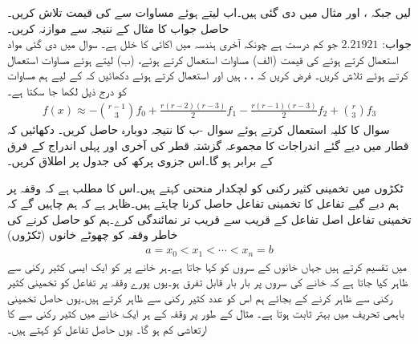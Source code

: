\quad
{} لیں جبکہ ،  اور  مثال  میں دی گئی ہیں۔اب  لیتے ہوئے مساوات  سے  کی قیمت تلاش کریں۔حاصل جواب کا مثال  کے نتیجہ سے موازنہ کریں۔\\
جواب:\quad
$\num{2.21921}$
جو کم درست ہے چونکہ آخری ہندسہ میں  اکائی کا خلل ہے۔
\quad
سوال  میں دی گئی مواد استعمال کرتے ہوئے  کی قیمت  (الف) مساوات  استعمال کرتے ہوئے، (ب)  لیتے ہوئے مساوات  استعمال کرتے ہوئے تلاش کریں۔ 
\quad
فرض کریں کہ ، ،  ہیں اور  استعمال کرتے ہوئے دکھائیں کہ  کے لیے  ہم مساوات   کو درج ذیل لکھا جا سکتا ہے۔
\begin{align*}
f(x)\approx -\binom{r-1}{3}f_0+\frac{r(r-2)(r-3)}{2}f_1-\frac{r(r-1)(r-3)}{2}f_2+\binom{r}{3}f_3
\end{align*}
\quad
سوال  کا کلیہ استعمال کرتے ہوئے سوال -ب کا نتیجہ دوبارہ حاصل کریں۔  
\quad {}\quad
دکھائیں کہ قطار میں دیے گئے اندراجات کا مجموعہ گزشتہ قطر کی آخری اور پہلی اندراج کے فرق کے برابر ہو گا۔اس جزوی پرکھ کی  جدول  پر اطلاق کریں۔

ٹکڑوں میں تخمینی کثیر رکنی کو لچکدار منحنی کہتے ہیں۔اس کا مطلب ہے کہ وقفہ  پر ہم دیے گیے تفاعل  کا تخمینی تفاعل  حاصل کرنا چاہتے ہیں۔ظاہر ہے کہ ہم چاہیں گے کہ تخمینی تفاعل اصل تفاعل کے قریب سے قریب تر نمائندگی کرے۔ہم  کو حاصل کرنے کی خاطر وقفہ  کو چھوٹے خانوں (ٹکڑوں) 
\begin{align}\label{مساوات_اعدادی_لچکدار_منحنی_ٹکڑے_الف}
a=x_0<x_1<\cdots<x_n=b
\end{align}
 میں تقسیم کرتے ہیں جہاں خانوں کے  سروں  کو  کہا جاتا ہے۔ہر خانے  پر  کو ایک ایسی  کثیر رکنی  سے ظاہر کیا جاتا ہے  کہ خانے کی سروں پر  بار بار قابل تفرق ہو۔یوں پورے وقفہ  پر تفاعل  کو تخمینی کثیر رکنی سے ظاہر کرنے کے بجائے ہم اس کو  عدد کثیر رکنی سے ظاہر کرتے ہیں۔یوں حاصل تخمینی   باہمی تحریف میں بہتر ثابت ہوتا ہے۔ مثال کے طور پر وقفہ  کے ہر ایک خانے میں کثیر رکنی سے  کا  ارتعاشی کم ہو گا۔ یوں حاصل تفاعل  کو  کہتے ہیں۔

